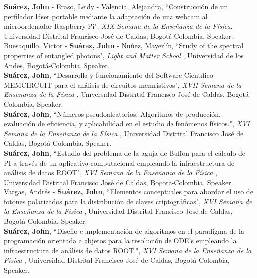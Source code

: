 \documentclass[10pt, a4paper]{article}
\newcommand{\years}[1]{\marginnote{\scriptsize #1}}
\begin{document}
\years{2016}\textbf{Suárez, John} - Eraso, Leidy - Valencia, Alejandra, “Construcción de un perfilador láser portable mediante la adaptación de una webcam al microordenador Raspberry Pi", \emph{XIX Semana de la Enseñanza de la Física}, Universidad Distrital Francisco José de Caldas, Bogotá-Colombia, Speaker.\\

\years{2016}Buesaquillo, Victor - \textbf{Suárez, John} - Nuñez, Mayerlín, “Study of the spectral properties of entangled photons", \emph{Light and Matter School }, Universidad de los Andes, Bogotá-Colombia, Speaker.\\

\years{2014}\textbf{Suárez, John}, “Desarrollo y funcionamiento del Software Científico MEMCIRCUIT para el análisis de circuitos memristivos", \emph{XVII Semana de la Enseñanza de la Física }, Universidad Distrital Francisco José de Caldas, Bogotá-Colombia, Speaker.\\

\years{2013}\textbf{Suárez, John}, “Números pseudoaleatorios: Algoritmos de producción, evaluación de eficiencia, y aplicabilidad en el estudio de fenómenos físicos.", \emph{XVI Semana de la Enseñanza de la Física }, Universidad Distrital Francisco José de Caldas, Bogotá-Colombia, Speaker.\\

\years{2013}\textbf{Suárez, John}, “Estudio del problema de la aguja de Buffon para el cálculo de PI a través de un aplicativo computacional empleando la infraestructura de análisis de datos ROOT", \emph{XVI Semana de la Enseñanza de la Física }, Universidad Distrital Francisco José de Caldas, Bogotá-Colombia, Speaker.\\

\years{2013}Vargas, Andrés - \textbf{Suárez, John}, “Elementos conceptuales para abordar el uso de fotones polarizados para la distribución de claves criptográficas", \emph{XVI Semana de la Enseñanza de la Física }, Universidad Distrital Francisco José de Caldas, Bogotá-Colombia, Speaker.\\

\years{2013}\textbf{Suárez, John}, “Diseño e implementación de algoritmos en el paradigma de la programación orientada a objetos para la resolución de ODE's empleando la infraestructura de análisis de datos ROOT.", \emph{XVI Semana de la Enseñanza de la Física }, Universidad Distrital Francisco José de Caldas, Bogotá-Colombia, Speaker.\\
\end{document}
